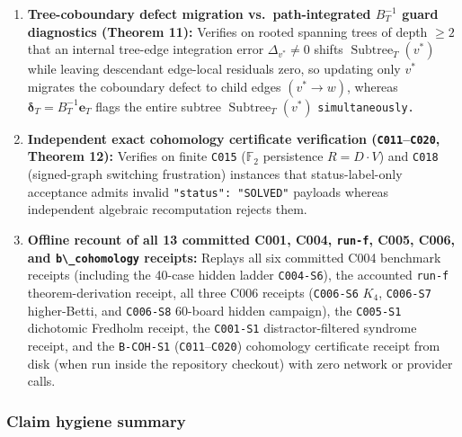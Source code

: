 \documentclass[
  11pt,
]{article}
\newcommand{\passthrough}[1]{#1}
\begin{document}
\begin{enumerate}
\item
  \textbf{Tree-coboundary defect migration vs.~path-integrated
  \(B_T^{-1}\) guard diagnostics (Theorem 11):} Verifies on rooted
  spanning trees of depth \(\ge 2\) that an internal tree-edge
  integration error \(\Delta_{v^*} \ne 0\) shifts
  \(\operatorname{Subtree}_T(v^*)\) while leaving descendant edge-local
  residuals zero, so updating only \(v^*\) migrates the coboundary
  defect to child edges \((v^* \to w)\), whereas
  \(\boldsymbol{\delta}_T = B_T^{-1}\mathbf{e}_T\) flags the entire
  subtree \(\operatorname{Subtree}_T(v^*)\) \nolinkurl{simultaneously.}
\item
  \textbf{Independent exact cohomology certificate verification
  (\passthrough{\lstinline!C011!}--\passthrough{\lstinline!C020!},
  Theorem 12):} Verifies on finite \passthrough{\lstinline!C015!}
  (\(\mathbb{F}_2\) persistence \(R = D \cdot V\)) and
  \passthrough{\lstinline!C018!} (signed-graph switching frustration)
  instances that status-label-only acceptance admits invalid
  \passthrough{\lstinline!"status": "SOLVED"!} payloads whereas
  independent algebraic recomputation rejects them.
\item
  \textbf{Offline recount of all 13 committed C001, C004,
  \nolinkurl{run-f}, C005, C006, and
  \passthrough{\lstinline!b\_cohomology!} receipts:} Replays all six
  committed C004 benchmark receipts (including the 40-case hidden ladder
  \passthrough{\lstinline!C004-S6!}), the accounted
  \nolinkurl{run-f} theorem-derivation receipt, all three
  C006 receipts (\passthrough{\lstinline!C006-S6!} \(K_4\),
  \passthrough{\lstinline!C006-S7!} higher-Betti, and
  \passthrough{\lstinline!C006-S8!} 60-board hidden campaign), the
  \passthrough{\lstinline!C005-S1!} dichotomic Fredholm receipt, the
  \passthrough{\lstinline!C001-S1!} distractor-filtered syndrome
  receipt, and the \passthrough{\lstinline!B-COH-S1!}
  (\passthrough{\lstinline!C011!}--\passthrough{\lstinline!C020!})
  cohomology certificate receipt from disk (when run inside the
  repository checkout) with zero network or provider calls.
\end{enumerate}

\subsubsection{Claim hygiene summary}\label{claim-hygiene-summary}
\end{document}
